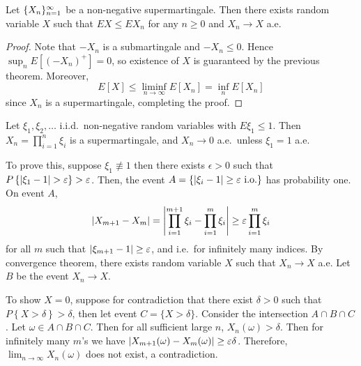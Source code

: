 \documentclass[a4paper]{article}
\begin{document}
\begin{cor}
  Let $\{ X_n \}_{n=1}^\infty$ be a non-negative supermartingale.
  Then there exists random variable $X$ such that
  $E X \leq E X_n$ for any $n \geq 0$ and $X_n \to X$ a.e.
\end{cor}

\begin{proof}
  Note that $-X_n$ is a submartingale and $-X_n \leq 0$.
  Hence $\sup_n E [(-X_n)^+] = 0$, so existence of $X$ is guaranteed
  by the previous theorem. Moreover,
  \[
    E[X] \leq \liminf_{n \to \infty} E[X_n] = \inf_n E[X_n]
  \]
  since $X_n$ is a supermartingale, completing the proof.

\end{proof}

\begin{eg}
  Let $\xi_1, \xi_2, \dots$ i.i.d.\ non-negative random variables
  with $E \xi_1 \leq 1$. Then $X_n = \prod_{i=1}^n \xi_i$
  is a supermartingale, and $X_n \to 0$ a.e.\ unless $\xi_1 = 1$ a.e.

  To prove this,
  suppose $\xi_1 \not\equiv 1$ then there exists $\epsilon > 0$ such that
  $P \left\{ \left\lvert \xi_1 - 1\right\rvert > \varepsilon \right\} > \varepsilon$.
  Then, the event $A = \{ \left\lvert \xi_i - 1\right\rvert \geq \varepsilon \text{ i.o.} \}$
  has probability one.
  On event $A$,
  \[
    \left\lvert X_{m + 1} - X_m\right\rvert =
    \left\lvert \prod_{i=1}^{m + 1} \xi_i - \prod_{i=1}^m \xi_i\right\rvert \geq
    \varepsilon \prod_{i=1}^m \xi_i
  \]
  for all $m$ such that $\left\lvert \xi_{m+1} - 1\right\rvert \geq \varepsilon$,
  and i.e.\ for infinitely many indices. By convergence theorem,
  there exists random variable $X$ such that $X_n \to X$ a.e.
  Let $B$ be the event $X_n \to X$.

  To show $X = 0$, suppose for contradiction that
  there exist $\delta > 0$ such that $ P \left\{ X > \delta \right\}
    > \delta$, then let event $C = \{ X > \delta \}$.
  Consider the intersection $A \cap B \cap C$.
  Let $\omega \in A \cap B \cap C$. Then for all sufficient
  large $n$, $X_n (\omega) > \delta$. Then for infinitely many $m$'s
  we have $\left\lvert X_{m + 1} (\omega) - X_{m} (\omega)\right\rvert \geq \varepsilon \delta$.
  Therefore, $\lim_{n \to \infty} X_n (\omega)$ does not exist, a
  contradiction.

\end{eg}
\end{document}
